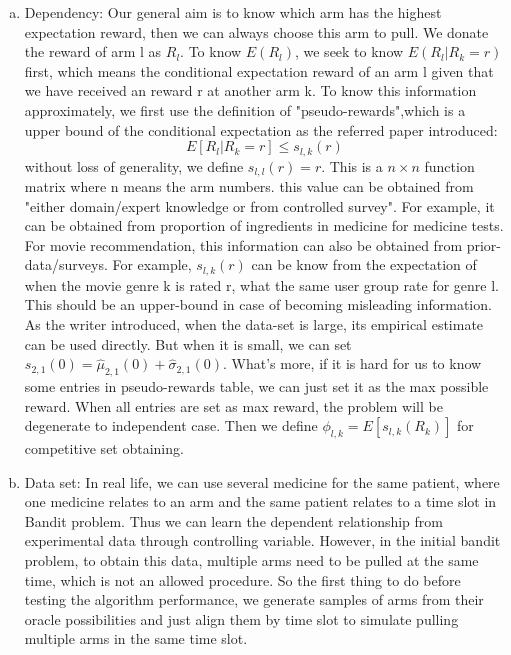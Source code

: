 \documentclass{article}
\begin{document}
\begin{homeworkProblem}
\begin{enumerate}
\begin{enumerate}[a.]
            \item Dependency:
            Our general aim is to know which arm has the highest expectation reward, then we can always choose this arm to pull. We donate the reward of arm l as $R_l$. To know $E(R_l)$, we seek to know $E(R_l| R_k=r)$ first, which means the conditional expectation reward of an arm l given that we have received an reward r at another arm k.
            To know this information approximately, we first use the definition of "pseudo-rewards",which is a upper bound of the conditional expectation as the referred paper introduced: $$E[R_l|R_k = r]\leqslant s_{l,k}(r)$$\cite{ref3}  without loss of generality, we define $s_{l,l}(r)=r$.
            This is a $n\times n$ function matrix where n means the arm numbers. this value can be obtained from "either domain/expert knowledge or from controlled survey"\cite{ref3}. For example, it can be obtained from proportion of ingredients in medicine for medicine tests. For movie recommendation, this information can also be obtained from prior-data/surveys. For example, $s_{l,k}(r)$ can be know from the expectation of when the movie genre k is rated r, what the same user group rate for genre l. This should be an upper-bound in case of becoming misleading information. As the writer introduced, when the data-set is large, its empirical estimate can be used directly. But when it is small, we can set $s_{2,1}(0)=\hat{\mu}_{2,1}(0)+\hat{\sigma}_{2,1}(0)$. What's more, if it is hard for us to know some entries in pseudo-rewards table, we can just set it as the max possible reward. When all entries are set as max reward, the problem will be degenerate to independent case. 
            Then we define $\phi_{l,k} = E[s_{l,k}(R_k)]$ for competitive set obtaining.

            \item Data set:
            In real life, we can use several medicine for the same patient, where one medicine relates to an arm and the same patient relates to a time slot in Bandit problem. Thus we can learn the dependent relationship from experimental data through controlling variable. However, in the initial bandit problem, to obtain this data, multiple arms need to be pulled at the same time, which is not an allowed procedure. So the first thing to do before testing the algorithm performance, we generate samples of arms from their oracle possibilities and just align them by time slot to simulate pulling multiple arms in the same time slot.
            

\end{enumerate}
\end{enumerate}
\end{homeworkProblem}
\end{document}
